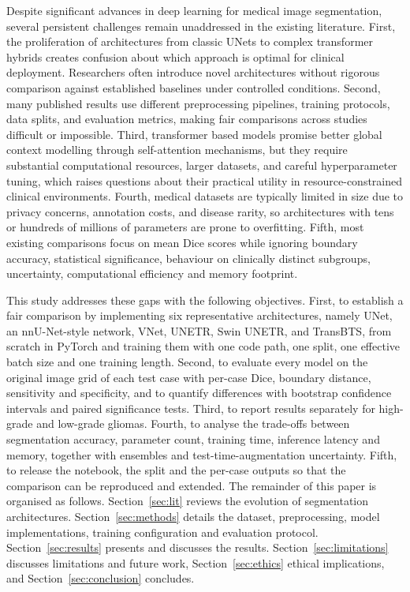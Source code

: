 \documentclass[a4paper,fleqn]{cas-sc}
\begin{document}
Despite significant advances in deep learning for medical image segmentation, several persistent challenges remain unaddressed in the existing literature. First, the proliferation of architectures from classic UNets to complex transformer hybrids creates confusion about which approach is optimal for clinical deployment. Researchers often introduce novel architectures without rigorous comparison against established baselines under controlled conditions. Second, many published results use different preprocessing pipelines, training protocols, data splits, and evaluation metrics, making fair comparisons across studies difficult or impossible. Third, transformer based models promise better global context modelling through self-attention mechanisms, but they require substantial computational resources, larger datasets, and careful hyperparameter tuning, which raises questions about their practical utility in resource-constrained clinical environments. Fourth, medical datasets are typically limited in size due to privacy concerns, annotation costs, and disease rarity, so architectures with tens or hundreds of millions of parameters are prone to overfitting. Fifth, most existing comparisons focus on mean Dice scores while ignoring boundary accuracy, statistical significance, behaviour on clinically distinct subgroups, uncertainty, computational efficiency and memory footprint.

This study addresses these gaps with the following objectives. First, to establish a fair comparison by implementing six representative architectures, namely UNet, an nnU-Net-style network, VNet, UNETR, Swin UNETR, and TransBTS, from scratch in PyTorch and training them with one code path, one split, one effective batch size and one training length. Second, to evaluate every model on the original image grid of each test case with per-case Dice, boundary distance, sensitivity and specificity, and to quantify differences with bootstrap confidence intervals and paired significance tests. Third, to report results separately for high-grade and low-grade gliomas. Fourth, to analyse the trade-offs between segmentation accuracy, parameter count, training time, inference latency and memory, together with ensembles and test-time-augmentation uncertainty. Fifth, to release the notebook, the split and the per-case outputs so that the comparison can be reproduced and extended. The remainder of this paper is organised as follows. Section~\ref{sec:lit} reviews the evolution of segmentation architectures. Section~\ref{sec:methods} details the dataset, preprocessing, model implementations, training configuration and evaluation protocol. Section~\ref{sec:results} presents and discusses the results. Section~\ref{sec:limitations} discusses limitations and future work, Section~\ref{sec:ethics} ethical implications, and Section~\ref{sec:conclusion} concludes.
\end{document}
